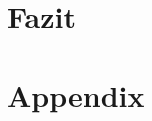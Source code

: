 \documentclass[12pt,a4paper,ngerman,english]{report}
\begin{document}
\section{}
\subsection{}
\subsection{}

\chapter{Fazit}

\chapter*{Appendix} 



\begin{sidewaysfigure}

\end{sidewaysfigure}



\end{document}
